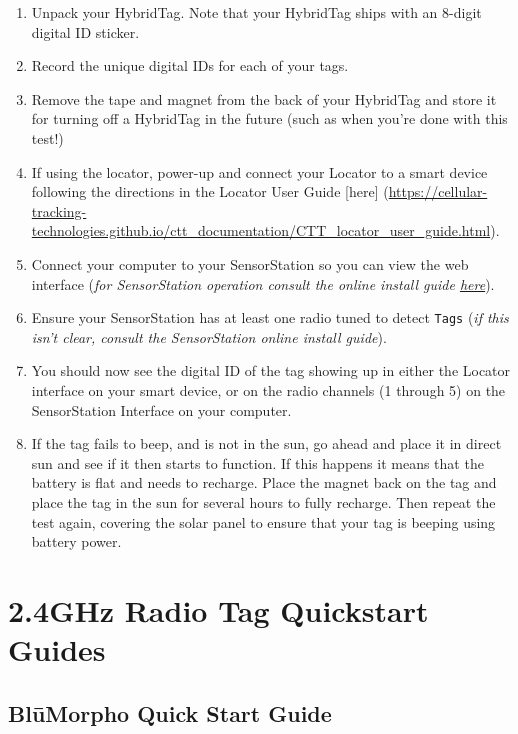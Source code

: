 \documentclass[
]{article}
\begin{document}
\begin{enumerate}
\def\labelenumi{\arabic{enumi}.}
\item
  Unpack your HybridTag. Note that your HybridTag ships with an 8-digit
  digital ID sticker.
\item
  Record the unique digital IDs for each of your tags.
\item
  Remove the tape and magnet from the back of your HybridTag and store
  it for turning off a HybridTag in the future (such as when you're done
  with this test!)
\item
  If using the locator, power-up and connect your Locator to a smart
  device following the directions in the Locator User Guide {[}here{]}
  (\url{https://cellular-tracking-technologies.github.io/ctt_documentation/CTT_locator_user_guide.html}).
\item
  Connect your computer to your SensorStation so you can view the web
  interface (\emph{for SensorStation operation consult the online
  install guide
  \href{https://cellular-tracking-technologies.github.io/ctt_documentation/v2-SensorStation-User-Guide.html\#connecting-to-your-sensorstation-web-interface}{here}}).
\item
  Ensure your SensorStation has at least one radio tuned to detect
  \texttt{Tags} (\emph{if this isn't clear, consult the SensorStation
  online install guide}).
\item
  You should now see the digital ID of the tag showing up in either the
  Locator interface on your smart device, or on the radio channels (1
  through 5) on the SensorStation Interface on your computer.
\item
  If the tag fails to beep, and is not in the sun, go ahead and place it
  in direct sun and see if it then starts to function. If this happens
  it means that the battery is flat and needs to recharge. Place the
  magnet back on the tag and place the tag in the sun for several hours
  to fully recharge. Then repeat the test again, covering the solar
  panel to ensure that your tag is beeping using battery power.
\end{enumerate}

\hypertarget{ghz-radio-tag-quickstart-guides}{%
\section{2.4GHz Radio Tag Quickstart
Guides}\label{ghz-radio-tag-quickstart-guides}}

\hypertarget{blux16bmorpho-quick-start-guide}{%
\subsection{BlūMorpho Quick Start
Guide}\label{blux16bmorpho-quick-start-guide}}
\end{document}

